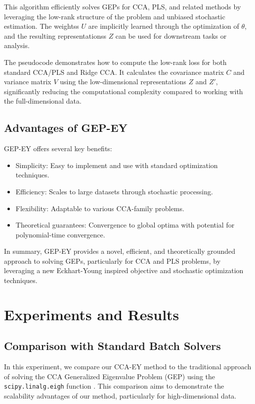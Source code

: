 This algorithm efficiently solves GEPs for CCA, PLS, and related methods by leveraging the low-rank structure of the problem and unbiased stochastic estimation. The \glspl{weights} $U$ are implicitly learned through the optimization of $\theta$, and the resulting \glspl{representations} $Z$ can be used for downstream tasks or analysis.

The pseudocode demonstrates how to compute the low-rank loss for both standard CCA/PLS and Ridge CCA. It calculates the covariance matrix $C$ and variance matrix $V$ using the low-dimensional representations $Z$ and $Z'$, significantly reducing the computational complexity compared to working with the full-dimensional data.

\subsection{Advantages of GEP-EY}
GEP-EY offers several key benefits:
\begin{itemize}
\item Simplicity: Easy to implement and use with standard optimization techniques.
\item Efficiency: Scales to large datasets through stochastic processing.
\item Flexibility: Adaptable to various CCA-family problems.
\item Theoretical guarantees: Convergence to global optima with potential for polynomial-time convergence.
\end{itemize}

In summary, GEP-EY provides a novel, efficient, and theoretically grounded approach to solving GEPs, particularly for CCA and PLS problems, by leveraging a new Eckhart-Young inspired objective and stochastic optimization techniques.

\section{Experiments and Results}\label{sec:experiments}
\subsection{Comparison with Standard Batch Solvers}
In this experiment, we compare our CCA-EY method to the traditional approach of solving the CCA Generalized Eigenvalue Problem (GEP) using the \texttt{scipy.linalg.eigh} function \citep{virtanen2020scipy}. This comparison aims to demonstrate the scalability advantages of our method, particularly for high-dimensional data.


